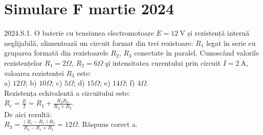 \section{Simulare F martie 2024}

2024.S.1. O baterie cu tensiunea electromotoare $E=12 \mathrm{~V}$ și rezistență internă neglijabilă, alimentează un circuit format din trei rezistoare: $R_{1}$ legat în serie cu gruparea formată din rezistoarele $R_{2}$, $R_{3}$ conectate în paralel. Cunoscând valorile rezistențelor $R_{1}=2 \Omega$, $R_{2}=6 \Omega$ şi intensitatea curentului prin circuit $I=2 \mathrm{~A}$, valoarea rezistenței $R_{3}$ este:\\ a) $12 \Omega$; b) $10 \Omega$; c) $5 \Omega$; d) $15 \Omega$; e) $14 \Omega$; f) $4 \Omega$.\\ Rezistența echivalentă a circuitului este:\\ $R_{e}=\frac{E}{I}=R_{1}+\frac{R_{2} R_{3}}{R_{2}+R_{3}}$.\\ De aici rezultă:\\ $R_{3}=\frac{\left(R_{e}-R_{1}\right) R_{2}}{R_{2}-R_{e}+R_{1}}=12 \Omega$. Răspuns corect a.\\

